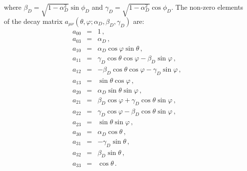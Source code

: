 where $\beta_D=\sqrt{1-\alpha_D^2}\sin\phi_D$ and 
 $\gamma_D=\sqrt{1-\alpha_D^2}\cos\phi_D$.
The non-zero elements  of the decay matrix $a_{\mu\nu}(\theta,\varphi;\alpha_D,\beta_D,\gamma_D)$  are: 
\begin{eqnarray}
a_{00}&=&1 \,, \nonumber\\
a_{03}&=&\alpha_D \,, \nonumber\\
a_{10}&=&\alpha_D\cos\varphi\sin\theta \,, \nonumber\\
a_{11}&=&\gamma_D \cos\theta\cos\varphi-\beta_D \sin\varphi \,, \nonumber\\
a_{12}&=&-\beta_D \cos\theta
\cos\varphi-\gamma_D \sin\varphi \,, \nonumber\\
a_{13}&=&\sin\theta \cos\varphi \,, \nonumber\\
a_{20}&=&\alpha_D\sin\theta \sin\varphi \,, \label{eqn:matrixa}\\
a_{21}&=&\beta_D \cos\varphi+\gamma_D \cos\theta \sin\varphi \,, \nonumber\\
a_{22}&=&\gamma_D\cos\varphi-\beta_D \cos\theta \sin\varphi \,, \nonumber\\
a_{23}&=&\sin\theta \sin\varphi \,, \nonumber\\
a_{30}&=&\alpha_D\cos\theta \,, \nonumber\\
a_{31}&=&-\gamma_D\sin\theta \,, \nonumber\\
a_{32}&=&\beta_D\sin\theta \,, \nonumber\\
a_{33}&=&\cos\theta\, .\nonumber
\end{eqnarray}


